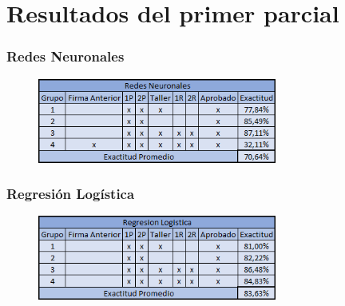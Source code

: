 \documentclass{beamer}
\begin{document}
\section{Resultados del primer parcial}
\begin{frame}
    \frametitle{Redes Neuronales}
    \begin{figure}
        \centering
        \includegraphics[width=0.7\textwidth]{Imagenes/Resultado_RN.png}

    \end{figure}
\end{frame}

\begin{frame}
    \frametitle{Regresión Logística}
    \begin{figure}
        \centering
        \includegraphics[width=0.7\textwidth]{Imagenes/Resultado_RL.png}
    \end{figure}
\end{frame}
\end{document}
